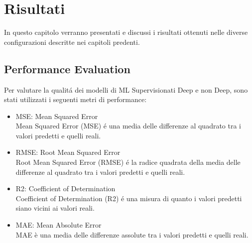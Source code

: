 \documentclass[../../Report.tex]{subfiles}
\begin{document}
\chapter{Risultati}
In questo capitolo verranno presentati e discussi i risultati ottenuti nelle diverse configurazioni descritte nei capitoli predenti.

\section{Performance Evaluation}
Per valutare la qualitá dei modelli di ML Supervisionati Deep e non Deep, sono stati utilizzati i seguenti metri di performance:
\begin{itemize}
    \item MSE: Mean Squared Error\\Mean Squared Error (MSE) é una media delle differenze al quadrato tra i valori predetti e quelli reali.
    \item RMSE: Root Mean Squared Error\\ Root Mean Squared Error (RMSE) é la radice quadrata della media delle differenze al quadrato tra i valori predetti e quelli reali.
    \item R2: Coefficient of Determination\\ Coefficient of Determination (R2) é una misura di quanto i valori predetti siano vicini ai valori reali.
    \item MAE: Mean Absolute Error\\ MAE è una media delle differenze assolute tra i valori predetti e quelli reali.
\end{itemize}
\end{document}
